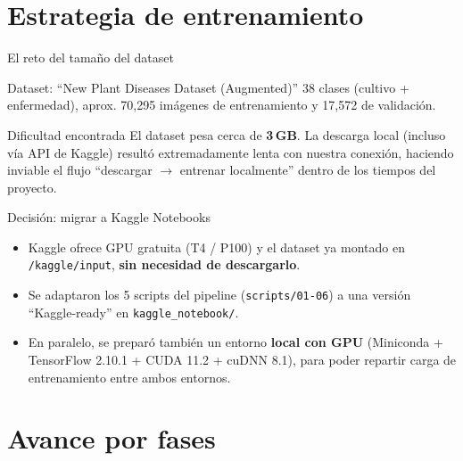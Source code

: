\documentclass[aspectratio=169]{beamer}
\begin{document}
\section{Estrategia de entrenamiento}

\begin{frame}{El reto del tamaño del dataset}
  \begin{block}{Dataset: ``New Plant Diseases Dataset (Augmented)''}
    38 clases (cultivo + enfermedad), aprox. 70{,}295 imágenes de entrenamiento y 17{,}572 de validación.
  \end{block}
  \vspace{0.3cm}
  \begin{alertblock}{Dificultad encontrada}
    El dataset pesa cerca de \textbf{3\,GB}. La descarga local (incluso vía API de Kaggle) resultó extremadamente lenta con nuestra conexión, haciendo inviable el flujo ``descargar $\rightarrow$ entrenar localmente'' dentro de los tiempos del proyecto.
  \end{alertblock}
\end{frame}

\begin{frame}{Decisión: migrar a Kaggle Notebooks}
  \begin{itemize}
    \item Kaggle ofrece GPU gratuita (T4 / P100) y el dataset ya montado en \texttt{/kaggle/input}, \textbf{sin necesidad de descargarlo}.
    \item Se adaptaron los 5 scripts del pipeline (\texttt{scripts/01-06}) a una versión ``Kaggle-ready'' en \texttt{kaggle\_notebook/}.
    \item En paralelo, se preparó también un entorno \textbf{local con GPU} (Miniconda + TensorFlow 2.10.1 + CUDA 11.2 + cuDNN 8.1), para poder repartir carga de entrenamiento entre ambos entornos.
  \end{itemize}
\end{frame}

\section{Avance por fases}
\end{document}
